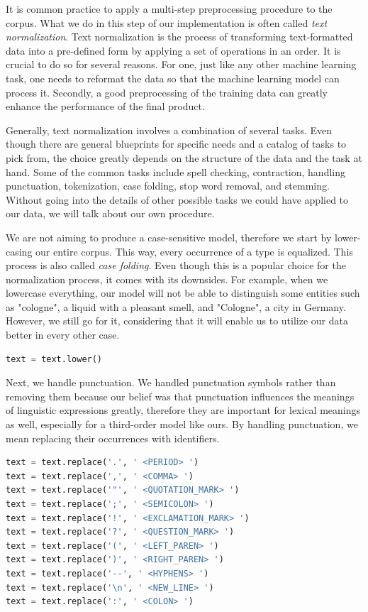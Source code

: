 It is common practice to apply a multi-step preprocessing procedure to the corpus. What we do in this step of our implementation is often called \textit{text normalization}. Text normalization is the process of transforming text-formatted data into a pre-defined form by applying a set of operations in an order. It is crucial to do so for several reasons. For one, just like any other machine learning task, one needs to reformat the data so that the machine learning model can process it. Secondly, a good preprocessing of the training data can greatly enhance the performance of the final product.

Generally, text normalization involves a combination of several tasks. Even though there are general blueprints for specific needs and a catalog of tasks to pick from, the choice greatly depends on the structure of the data and the task at hand. Some of the common tasks include spell checking, contraction, handling punctuation, tokenization, case folding, stop word removal, and stemming. Without going into the details of other possible tasks we could have applied to our data, we will talk about our own procedure.

We are not aiming to produce a case-sensitive model, therefore we start by lower-casing our entire corpus. This way, every occurrence of a type is equalized. This process is also called \textit{case folding}. Even though this is a popular choice for the normalization process, it comes with its downsides. For example, when we lowercase everything, our model will not be able to distinguish some entities such as "cologne", a liquid with a pleasant smell, and "Cologne", a city in Germany. However, we still go for it, considering that it will enable us to utilize our data better in every other case.

\begin{lstlisting}[language=Python, caption=Case folding]
text = text.lower()
\end{lstlisting}

Next, we handle punctuation. We handled punctuation symbols rather than removing them because our belief was that punctuation influences the meanings of linguistic expressions greatly, therefore they are important for lexical meanings as well, especially for a third-order model like ours. By handling punctuation, we mean replacing their occurrences with identifiers.

\begin{lstlisting}[language=Python, caption=Handling Punctuation]
text = text.replace('.', ' <PERIOD> ')
text = text.replace(',', ' <COMMA> ')
text = text.replace('"', ' <QUOTATION_MARK> ')
text = text.replace(';', ' <SEMICOLON> ')
text = text.replace('!', ' <EXCLAMATION_MARK> ')
text = text.replace('?', ' <QUESTION_MARK> ')
text = text.replace('(', ' <LEFT_PAREN> ')
text = text.replace(')', ' <RIGHT_PAREN> ')
text = text.replace('--', ' <HYPHENS> ')
text = text.replace('\n', ' <NEW_LINE> ')
text = text.replace(':', ' <COLON> ')
\end{lstlisting}

